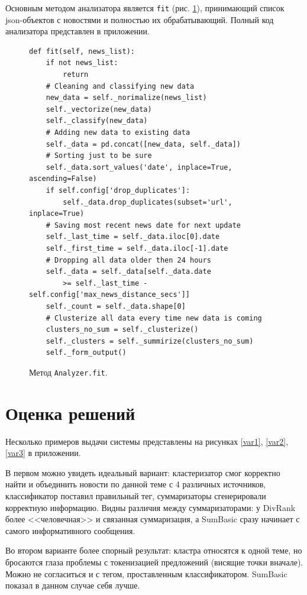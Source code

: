 \documentclass[a4paper, 14pt]{extarticle}
\begin{document}
Основным методом анализатора является \texttt{fit} (рис. \ref{fit}), принимающий список json-объектов с новостями и полностью их обрабатывающий. Полный код анализатора представлен в приложении.



\begin{figure}
	\centering
	\begin{verbatim}
def fit(self, news_list):
    if not news_list:
        return
    # Cleaning and classifying new data
    new_data = self._norimalize(news_list)
    self._vectorize(new_data)
    self._classify(new_data)
    # Adding new data to existing data
    self._data = pd.concat([new_data, self._data])
    # Sorting just to be sure
    self._data.sort_values('date', inplace=True, ascending=False)
    if self.config['drop_duplicates']:
        self._data.drop_duplicates(subset='url', inplace=True)
    # Saving most recent news date for next update
    self._last_time = self._data.iloc[0].date
    self._first_time = self._data.iloc[-1].date
    # Dropping all data older then 24 hours
    self._data = self._data[self._data.date
        >= self._last_time - self.config['max_news_distance_secs']]
    self._count = self._data.shape[0]
    # Clusterize all data every time new data is coming
    clusters_no_sum = self._clusterize()
    self._clusters = self._summirize(clusters_no_sum)
    self._form_output()
	\end{verbatim}
	\caption{Метод \texttt{Analyzer.fit}.}
	\label{fit}
\end{figure}


\section{Оценка решений}
Несколько примеров выдачи системы представлены на рисунках \ref{var1}, \ref{var2}, \ref{var3} в приложении.

В первом можно увидеть идеальный вариант: кластеризатор смог корректно найти и объединить новости по данной теме с 4 различных источников, классификатор поставил правильный тег, суммаризаторы сгенерировали корректную информацию. Видны различия между суммаризаторами: у DivRank более <<человечная>> и связанная суммаризация, а SumBasic сразу начинает с самого информативного сообщения.

Во втором варианте более спорный результат: кластра относятся к одной теме, но бросаются глаза проблемы с токенизацией предложений (висящие точки вначале). Можно не согласиться и с тегом, проставленным классификатором. SumBasic показал в данном случае себя лучше.
\end{document}
